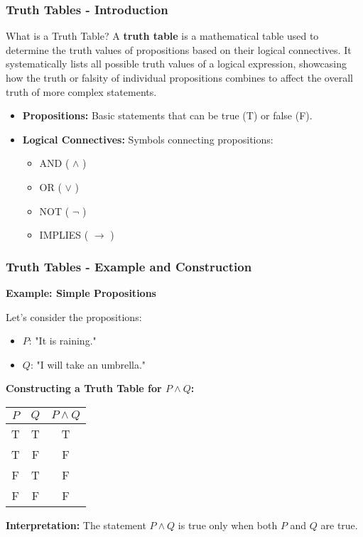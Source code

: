 \documentclass[aspectratio=169]{beamer}
\begin{document}
\begin{frame}[fragile]
  \frametitle{Truth Tables - Introduction}
  \begin{block}{What is a Truth Table?}
    A \textbf{truth table} is a mathematical table used to determine the truth values of propositions based on their logical connectives. It systematically lists all possible truth values of a logical expression, showcasing how the truth or falsity of individual propositions combines to affect the overall truth of more complex statements.
  \end{block}
  
  \begin{itemize}
    \item \textbf{Propositions:} Basic statements that can be true (T) or false (F).
    \item \textbf{Logical Connectives:} Symbols connecting propositions:
      \begin{itemize}
        \item AND ( $\land$ )
        \item OR ( $\lor$ )
        \item NOT ( $\neg$ )
        \item IMPLIES ( $\to$ )
      \end{itemize}
  \end{itemize}
\end{frame}

\begin{frame}[fragile]
  \frametitle{Truth Tables - Example and Construction}
  \textbf{Example: Simple Propositions}
  
  Let’s consider the propositions:
  \begin{itemize}
    \item \( P \): "It is raining."
    \item \( Q \): "I will take an umbrella."
  \end{itemize}
  
  \textbf{Constructing a Truth Table for \( P \land Q \):}
  
  \begin{table}[h]
    \centering
    \begin{tabular}{|c|c|c|}
      \hline
      $P$ & $Q$ & $P \land Q$ \\
      \hline
      T & T & T \\
      T & F & F \\
      F & T & F \\
      F & F & F \\
      \hline
    \end{tabular}
  \end{table}
  
  \textbf{Interpretation:} The statement \( P \land Q \) is true only when both \( P \) and \( Q \) are true.
\end{frame}
\end{document}
